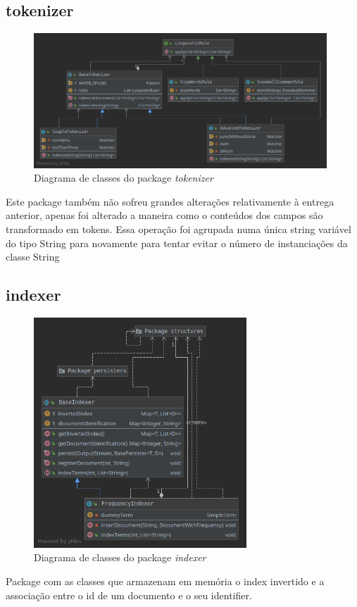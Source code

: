 \documentclass[12pt]{article}
\begin{document}
\subsection{tokenizer}
\begin{figure}[h]
  \center
  \includegraphics[width=11cm]{packages_tokenizer.png}
  \caption{Diagrama de classes do package \it tokenizer}
\end{figure}

Este package também não sofreu grandes alterações relativamente à
entrega anterior, apenas foi alterado a maneira como o conteúdos dos
campos são transformado em tokens. Essa operação foi agrupada numa
única string variável do tipo String para novamente para tentar
evitar o número de instanciações da classe String

\subsection{indexer}
\begin{figure}[h]
  \center
  \includegraphics[width=8cm]{packages_indexer.png}
  \caption{Diagrama de classes do package \it indexer}
\end{figure}

Package com as classes que armazenam em memória o index invertido e
a associação entre o id de um documento e o seu identifier.
\end{document}

